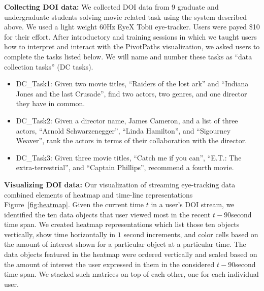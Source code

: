 \textbf{Collecting DOI data:} We collected DOI data from 9 graduate and undergraduate students solving movie related task using the system described above. We used a light weight 60Hz EyeX Tobii eye-tracker. Users were payed \$10 for their effort. After introductory and training sessions in which we taught users how to interpret and interact with the PivotPaths visualization, we asked users to complete the tasks listed below. We will name and number these tasks as ``data collection tasks'' (DC tasks).
\begin{itemize}
	\item DC\_Task1: Given two movie titles, ``Raiders of the lost ark'' and ``Indiana Jones and the last Crusade'', find two actors, two genres, and one director they have in common. 
	\item DC\_Task2: Given a director name, James Cameron, and a list of three actors, ``Arnold Schwarzenegger'', ``Linda Hamilton'', and ``Sigourney Weaver'', rank the actors in terms of their collaboration with the director. 
	\item DC\_Task3: Given three movie titles, ``Catch me if you can'', ``E.T.: The extra-terrestrial'', and ``Captain Phillips'', recommend a fourth movie. 
\end{itemize}

 
\textbf{Visualizing DOI data:}  Our visualization of streaming eye-tracking data combined elements of heatmap and time-line representations Figure~\ref{fig:heatmap}. Given the current time $t$ in a user's DOI stream, we identified the ten data objects that user viewed most in the recent $t-90$second time span. We created heatmap representations which list those ten objects vertically, show time horizontally in $1$ second increments, and color cells based on the amount of interest shown for a particular object at a particular time. The data objects featured in the heatmap were ordered vertically and scaled based on the amount of interest the user expressed in them in the considered $t-90$second time span. We stacked such matrices on top of each other, one for each individual user.

